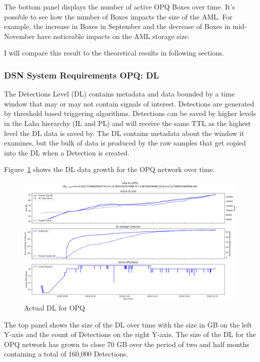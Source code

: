 The bottom panel displays the number of active OPQ Boxes over time. It's possible to see how the number of Boxes impacts the size of the AML. For example, the increase in Boxes in September and the decrease of Boxes in mid-November have noticeable impacts on the AML storage size.

I will compare this result to the theoretical results in following sections.

\subsubsection{DSN System Requirements OPQ: DL}

The Detections Level (DL) contains metadata and data bounded by a time window that may or may not contain signals of interest. Detections are generated by threshold based triggering algorithms. Detections can be saved by higher levels in the Laha hierarchy (IL and PL) and will receive the same TTL as the highest level the DL data is saved by. The DL contains metadata about the window it examines, but the bulk of data is produced by the raw samples that get copied into the DL when a Detection is created.

Figure~\ref{fig:actual_dl_opq} shows the DL data growth for the OPQ network over time.

\begin{figure}[H]
    \centering
    \includegraphics[width=\linewidth]{figures/actual_dl_opq.png}
    \caption{Actual DL for OPQ}
    \label{fig:actual_dl_opq}
\end{figure}

The top panel shows the size of the DL over time with the size in GB on the left Y-axis and the count of Detections on the right Y-axis. The size of the DL for the OPQ network has grown to close 70 GB over the period of two and half months containing a total of 160,000 Detections.

